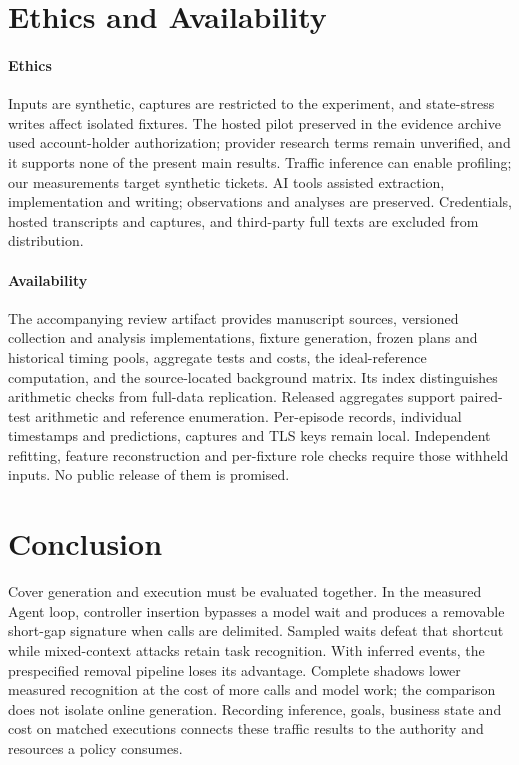 \section{Ethics and Availability}\label{sec:validity}
\paragraph{Ethics}
Inputs are synthetic, captures are restricted to the experiment, and state-stress writes affect isolated fixtures. The hosted pilot preserved in the evidence archive used account-holder authorization; provider research terms remain unverified, and it supports none of the present main results. Traffic inference can enable profiling; our measurements target synthetic tickets. AI tools assisted extraction, implementation and writing; observations and analyses are preserved. Credentials, hosted transcripts and captures, and third-party full texts are excluded from distribution.

\paragraph{Availability}
The accompanying review artifact provides manuscript sources, versioned collection and analysis implementations, fixture generation, frozen plans and historical timing pools, aggregate tests and costs, the ideal-reference computation, and the source-located background matrix. Its index distinguishes arithmetic checks from full-data replication. Released aggregates support paired-test arithmetic and reference enumeration. Per-episode records, individual timestamps and predictions, captures and TLS keys remain local. Independent refitting, feature reconstruction and per-fixture role checks require those withheld inputs. No public release of them is promised.

\section{Conclusion}
Cover generation and execution must be evaluated together. In the measured Agent loop, controller insertion bypasses a model wait and produces a removable short-gap signature when calls are delimited. Sampled waits defeat that shortcut while mixed-context attacks retain task recognition. With inferred events, the prespecified removal pipeline loses its advantage. Complete shadows lower measured recognition at the cost of more calls and model work; the comparison does not isolate online generation. Recording inference, goals, business state and cost on matched executions connects these traffic results to the authority and resources a policy consumes.

